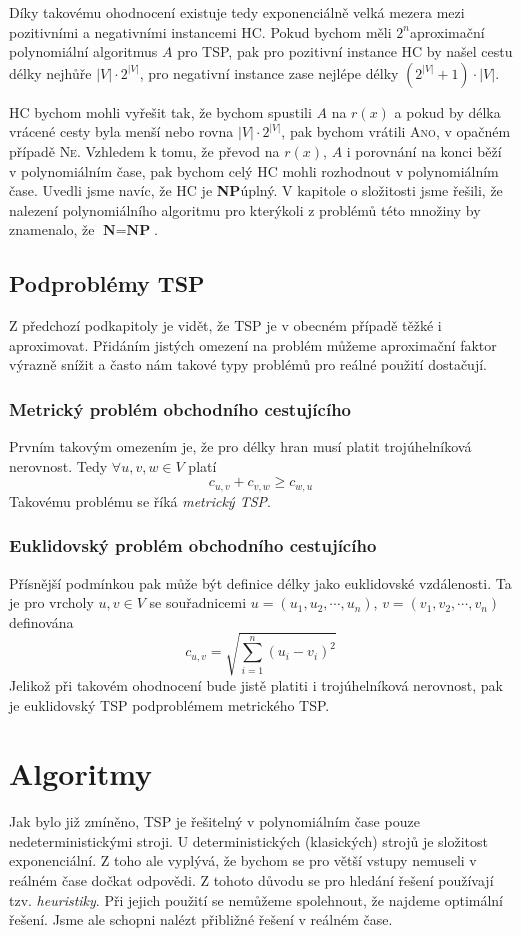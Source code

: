 \documentclass[
  biblatex,
  figures=false,
  glossaries,
  index
]{kidiplom}
\begin{document}
Díky takovému ohodnocení existuje tedy exponenciálně velká mezera mezi pozitivními a negativními instancemi HC. Pokud bychom měli $2^n$\textendash aproximační polynomiální algoritmus $A$ pro TSP, pak pro pozitivní instance HC by našel cestu délky nejhůře $|V|\cdot2^{|V|}$, pro negativní instance zase nejlépe délky $(2^{|V|} + 1) \cdot |V|$.

HC bychom mohli vyřešit tak, že bychom spustili $A$ na $r(x)$ a pokud by délka vrácené cesty byla menší nebo rovna $|V|\cdot2^{|V|}$, pak bychom vrátili \textsc{Ano}, v opačném případě \textsc{Ne}. Vzhledem k tomu, že převod na $r(x)$, $A$ i porovnání na konci běží v polynomiálním čase, pak bychom celý HC mohli rozhodnout v polynomiálním čase. Uvedli jsme navíc, že HC je \textbf{NP}\textendash úplný. V kapitole o složitosti jsme řešili, že nalezení polynomiálního algoritmu pro kterýkoli z problémů této množiny by znamenalo, že $\textbf{N} = \textbf{NP}$.

\subsection{Podproblémy TSP}
Z předchozí podkapitoly je vidět, že TSP je v obecném případě těžké i aproximovat. Přidáním jistých omezení na problém můžeme aproximační faktor výrazně snížit a často nám takové typy problémů pro reálné použití dostačují.

\subsubsection{Metrický problém obchodního cestujícího}
Prvním takovým omezením je, že pro délky hran musí platit trojúhelníková nerovnost. Tedy $\forall u, v, w \in V$ platí $$c_{u, v} + c_{v, w} \ge c_{w, u}$$
Takovému problému se říká \textit{metrický TSP}.

\subsubsection{Euklidovský problém obchodního cestujícího}
Přísnější podmínkou pak může být definice délky jako euklidovské vzdálenosti. Ta je pro vrcholy $u, v \in V$ se souřadnicemi $u = (u_1, u_2, \cdots, u_n)$, $v = (v_1, v_2, \cdots, v_n)$ definována
$$
c_{u, v} = \sqrt{\sum_{i=1}^{n} (u_i - v_i)^2}
$$
Jelikož při takovém ohodnocení bude jistě platiti i trojúhelníková nerovnost, pak je euklidovský TSP podproblémem metrického TSP.

\pagebreak
\section{Algoritmy}
Jak bylo již zmíněno, TSP je řešitelný v polynomiálním čase pouze nedeterministickými stroji. U deterministických (klasických) strojů je složitost exponenciální. Z toho ale vyplývá, že bychom se pro větší vstupy nemuseli v reálném čase dočkat odpovědi. Z tohoto důvodu se pro hledání řešení používají tzv. \textit{heuristiky}. Při jejich použití se nemůžeme spolehnout, že najdeme optimální řešení. Jsme ale schopni nalézt přibližné řešení v reálném čase.
\end{document}
